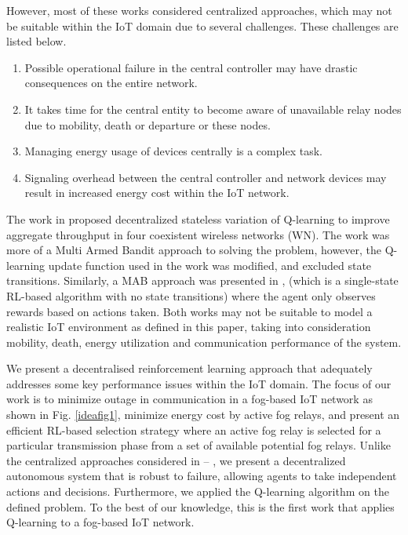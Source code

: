 \documentclass[journal]{IEEEtran}
\begin{document}
However, most of these works considered centralized approaches, which may not be suitable within the IoT domain due to several challenges. These challenges are listed below.
\begin{enumerate}
  \item Possible operational failure in the central controller may have drastic consequences on the entire network.
  \item It takes time for the central entity to become aware of unavailable relay nodes due to mobility, death or departure or these nodes.
  \item Managing energy usage of devices centrally is a complex task.
  \item Signaling overhead between the central controller and network devices may result in increased energy cost within the IoT network.
\end{enumerate}

The work in \cite{Wilhelmi2017} proposed decentralized stateless variation of Q-learning to improve aggregate throughput in four coexistent wireless networks (WN). The work was more of a Multi Armed Bandit approach to solving the problem, however, the Q-learning update function used in the work was modified, and excluded state transitions. Similarly, a MAB approach was presented in \cite{Azari2018}, (which is a single-state RL-based algorithm with no state transitions) where the agent only observes rewards based on actions taken. Both works may not be suitable to model a realistic IoT environment as defined in this paper, taking into consideration mobility, death, energy utilization and communication performance of the system.

We present a decentralised reinforcement learning approach that adequately addresses some key performance issues within the IoT domain. The focus of our work is to minimize outage in communication in a fog-based IoT network as shown in Fig. \ref{ideafig1}, minimize energy cost by active fog relays, and present an efficient RL-based selection strategy where an active fog relay is selected for a particular transmission phase from a set of available potential fog relays. Unlike the centralized approaches considered in \cite{OmoniwaRelay2018} -- \cite{Behdad2018}, we present a decentralized autonomous system that is robust to failure, allowing agents to take independent actions and decisions.
Furthermore, we applied the Q-learning algorithm on the defined problem. To the best of our knowledge, this is the first work that applies Q-learning to a fog-based IoT network.
\end{document}
